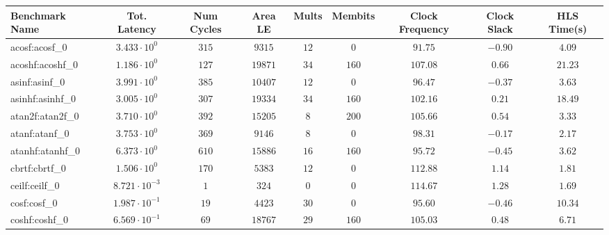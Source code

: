\begin{tabular}{|l|c|c|c|c|c|c|c|c|}
\hline
Benchmark Name               & Tot. Latency            & Num Cycles & Area LE    & Mults   & Membits  & Clock Frequency & Clock Slack & HLS Time(s) \\
\hline
acosf:acosf\_0               & $ 3.433 \cdot 10^{0}  $ & $ 315    $ & $ 9315   $ & $ 12  $ & $ 0    $ & $ 91.75       $ & $ -0.90   $ & $ 4.09    $ \\
acoshf:acoshf\_0             & $ 1.186 \cdot 10^{0}  $ & $ 127    $ & $ 19871  $ & $ 34  $ & $ 160  $ & $ 107.08      $ & $ 0.66    $ & $ 21.23   $ \\
asinf:asinf\_0               & $ 3.991 \cdot 10^{0}  $ & $ 385    $ & $ 10407  $ & $ 12  $ & $ 0    $ & $ 96.47       $ & $ -0.37   $ & $ 3.63    $ \\
asinhf:asinhf\_0             & $ 3.005 \cdot 10^{0}  $ & $ 307    $ & $ 19334  $ & $ 34  $ & $ 160  $ & $ 102.16      $ & $ 0.21    $ & $ 18.49   $ \\
atan2f:atan2f\_0             & $ 3.710 \cdot 10^{0}  $ & $ 392    $ & $ 15205  $ & $ 8   $ & $ 200  $ & $ 105.66      $ & $ 0.54    $ & $ 3.33    $ \\
atanf:atanf\_0               & $ 3.753 \cdot 10^{0}  $ & $ 369    $ & $ 9146   $ & $ 8   $ & $ 0    $ & $ 98.31       $ & $ -0.17   $ & $ 2.17    $ \\
atanhf:atanhf\_0             & $ 6.373 \cdot 10^{0}  $ & $ 610    $ & $ 15886  $ & $ 16  $ & $ 160  $ & $ 95.72       $ & $ -0.45   $ & $ 3.62    $ \\
cbrtf:cbrtf\_0               & $ 1.506 \cdot 10^{0}  $ & $ 170    $ & $ 5383   $ & $ 12  $ & $ 0    $ & $ 112.88      $ & $ 1.14    $ & $ 1.81    $ \\
ceilf:ceilf\_0               & $ 8.721 \cdot 10^{-3} $ & $ 1      $ & $ 324    $ & $ 0   $ & $ 0    $ & $ 114.67      $ & $ 1.28    $ & $ 1.69    $ \\
cosf:cosf\_0                 & $ 1.987 \cdot 10^{-1} $ & $ 19     $ & $ 4423   $ & $ 30  $ & $ 0    $ & $ 95.60       $ & $ -0.46   $ & $ 10.34   $ \\
coshf:coshf\_0               & $ 6.569 \cdot 10^{-1} $ & $ 69     $ & $ 18767  $ & $ 29  $ & $ 160  $ & $ 105.03      $ & $ 0.48    $ & $ 6.71    $ \\

\end{tabular}
